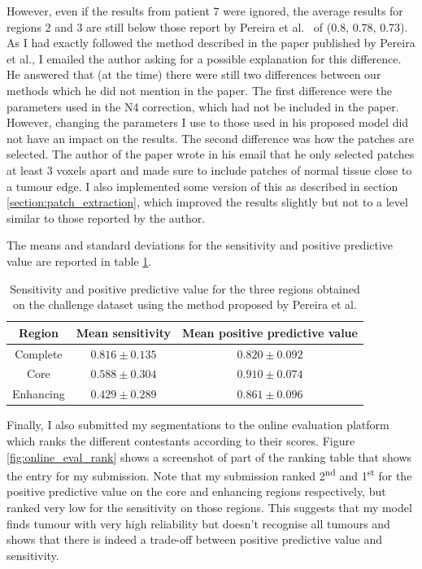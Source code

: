 \documentclass[12pt,a4paper,twoside,openright]{report}
\begin{document}
However, even if the results from patient 7 were ignored, the average results for regions 2 and 3 are still below those report by Pereira et al.\ \cite{pereira} of (0.8, 0.78, 0.73). As I had exactly followed the method described in the paper published by Pereira et al., I emailed the author asking for a possible explanation for this difference. He answered that (at the time) there were still two differences between our methods which he did not mention in the paper. The first difference were the parameters used in the N4 correction, which had not be included in the paper. However, changing the parameters I use to those used in his proposed model did not have an impact on the results. The second difference was how the patches are selected. The author of the paper wrote in his email that he only selected patches at least 3 voxels apart and made sure to include patches of normal tissue close to a tumour edge. I also implemented some version of this as described in section \ref{section:patch_extraction}, which improved the results slightly but not to a level similar to those reported by the author.

The means and standard deviations for the sensitivity and positive predictive value are reported in table \ref{table:pereira_sensitivity_average}.

\begin{table}
\centering	
\begin{tabular}{ c | c | c} 
\textbf{Region} & \textbf{Mean sensitivity } & \textbf{Mean positive predictive value} \\
\hline
Complete &	$0.816 \pm 0.135$ & $0.820 \pm 0.092$ \\
Core & 		$0.588 \pm 0.304$ & $0.910 \pm 0.074$ \\
Enhancing & $0.429 \pm 0.289$ & $0.861 \pm 0.096$ \\
\end{tabular}
\caption{Sensitivity and positive predictive value for the three regions obtained on the challenge dataset using the method proposed by Pereira et al.}
\label{table:pereira_sensitivity_average}
\end{table}

Finally, I also submitted my segmentations to the online evaluation platform which ranks the different contestants according to their scores. Figure \ref{fig:online_eval_rank} shows a screenshot of part of the ranking table that shows the entry for my submission. Note that my submission ranked 2\textsuperscript{nd} and 1\textsuperscript{st} for the positive predictive value on the core and enhancing regions respectively, but ranked very low for the sensitivity on those regions. This suggests that my model finds tumour with very high reliability but doesn't recognise all tumours and shows that there is indeed a trade-off between positive predictive value and sensitivity.
\end{document}
